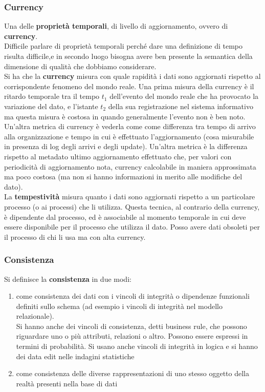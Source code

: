 \subsubsection{Currency}
Una delle \textbf{proprietà temporali}, di livello di aggiornamento, ovvero di \textbf{currency}.\\
Difficile parlare di proprietà temporali perché dare una definizione di tempo risulta difficile,e in secondo luogo bisogna avere ben presente la semantica della dimensione di qualità che dobbiamo considerare.\\
Si ha che la \textbf{currency} misura con quale rapidità i dati sono aggiornati rispetto al corrispondente fenomeno del mondo reale. Una prima misura della currency è il ritardo temporale tra il tempo $t_1$ dell’evento del mondo reale che ha provocato la variazione del dato, e l’istante $t_2$ della sua registrazione nel sistema informativo ma questa misura è costosa in quando generalmente l'evento non è ben noto.\\

Un'altra metrica di currency è vederla come come differenza tra tempo di arrivo alla organizzazione e tempo in cui è effettuato l’aggiornamento (cosa misurabile in presenza di log degli arrivi e degli update). Un'altra metrica è la differenza rispetto al metadato ultimo aggiornamento effettuato che, per valori con periodicità di aggiornamento nota, currency calcolabile in maniera approssimata ma poco costosa (ma non si hanno informazioni in merito alle modifiche del dato). \\

La \textbf{tempestività} misura quanto i dati sono aggiornati rispetto a un particolare processo (o ai processi) che li utilizza. Questa tecnica, al contrario della currency, è dipendente dal processo,  ed è associabile al momento temporale in cui deve essere disponibile per il processo che utilizza il dato. Posso avere dati obsoleti per il processo di chi li usa ma con alta currency.

\subsubsection{Consistenza}
Si definisce la \textbf{consistenza} in due modi:
\begin{enumerate}
    \item come consistenza dei dati con i vincoli di integrità o dipendenze funzionali definiti sullo schema (ad esempio i vincoli di integrità nel modello relazionale).\\
    Si hanno anche dei vincoli di consistenza, detti business rule, che possono riguardare uno o più attributi, relazioni o altro. Possono essere espressi in termini di probabilità. Si usano anche vincoli di integrità in logica e si hanno dei data edit nelle indagini statistiche
    \item come consistenza delle diverse rappresentazioni di uno stesso oggetto della realtà presenti nella base di dati
\end{enumerate}

